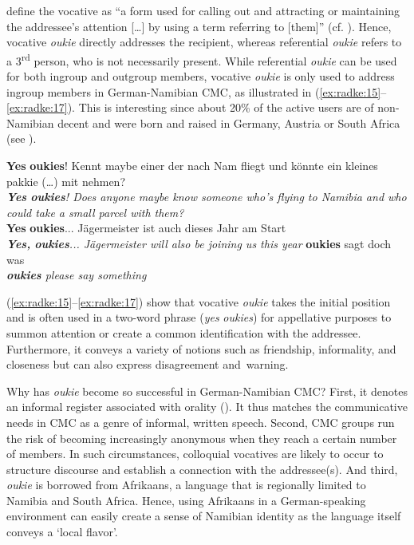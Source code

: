 \documentclass[output=paper]{langsci/langscibook}
\begin{document}
\citet[626]{daniel_vocative_2008} define the vocative as “a form used for calling out and attracting or maintaining the addressee’s attention […] by using a term referring to [them]” (cf. \citealt[2]{sonnenhauser_vocative!:_2013}). Hence, vocative \textit{oukie} directly addresses the recipient, whereas referential \textit{oukie} refers to a 3\textsuperscript{rd} person, who is not necessarily present. While referential \textit{oukie} can be used for both ingroup and outgroup members, vocative \textit{oukie} is only used to address ingroup members in German-Namibian CMC, as illustrated in (\ref{ex:radke:15}--\ref{ex:radke:17}). This is interesting since about 20\% of the active users are of non-Namibian decent and were born and raised in Germany, Austria or South Africa (see \citealt{radke_urban_inpress}).   

\ea 
 \label{ex:radke:15}
 \textbf{Yes} \textbf{oukies}! Kennt maybe einer der nach Nam fliegt und könnte ein kleines pakkie (…) mit nehmen?\\
 \textit{\textbf{Yes} \textbf{oukies}! Does anyone maybe know someone who’s flying to Namibia and who could take a small parcel with them?}\\
 \ex
\label{ex:radke:16}
 \textbf{Yes} \textbf{oukies}... Jägermeister ist auch dieses Jahr am Start\\
 \textit{\textbf{{Yes,}} \textbf{{oukies}}... Jägermeister will also be joining us this year}
 \ex\label{ex:radke:17}
 \textbf{oukies} sagt doch was\\
 \textit{\textbf{{oukies}} {please say something}}
 \z
 
(\ref{ex:radke:15}--\ref{ex:radke:17}) show that vocative \textit{oukie} takes the initial position and is often used in a two-word phrase (\textit{yes} \textit{oukies}) for appellative purposes to summon attention or create a common identification with the addressee. Furthermore, it conveys a variety of notions such as friendship, informality, and closeness but can also express disagreement and~warning. 

Why has \textit{oukie} become so successful in German-Namibian CMC? First, it denotes an informal register associated with orality (\citealt[3]{wiese_registerdifferenzierung_2021}). It thus matches the communicative needs in CMC as a genre of informal, written speech. Second, CMC groups run the risk of becoming increasingly anonymous when they reach a certain number of members. In such circumstances, colloquial vocatives are likely to occur to structure discourse and establish a connection with the addressee(s). And third, \textit{oukie} is borrowed from Afrikaans, a language that is regionally limited to Namibia and South Africa. Hence, using Afrikaans in a German-speaking environment can easily create a sense of Namibian identity as the language itself conveys a ‘local flavor’. 
\end{document}
